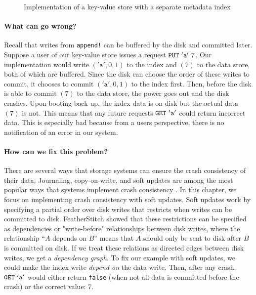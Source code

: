 
\begin{figure}[h]
  \centering
  \vspace{-.5em}
  \caption{Implementation of a key-value store with a separate metadata index}
  \label{fig:kv-single-index}
\end{figure}

\paragraph{What can go wrong?}
Recall that writes from \texttt{append!} can be buffered by the disk and committed later.
Suppose a user of our key-value store issues a request $\texttt{PUT}\ '\texttt{a}' \ 7$.
Our implementation would write $('\texttt{a}', 0, 1)$ to the index and $(7)$ to the data store, both of which are
buffered. Since the disk can choose the order of these writes to commit, it chooses to commit
$('\texttt{a}', 0, 1)$ to the index first. Then, before the disk is able to commit $(7)$ to the data store, the
power goes out and the disk crashes. Upon booting back up, the index data is on disk but the actual data $(7)$ is not.
This means that any future requests $\texttt{GET}\ '\texttt{a}'$ could return incorrect data. This is especially bad
because from a users perspective, there is no notification of an error in our system.

\paragraph{How can we fix this problem?}
There are several ways that storage systems can ensure the crash consistency of their data.
Journaling, copy-on-write, and soft updates are among the most popular ways that systems
implement crash consistency . In this chapter, we focus on implementing crash consistency
with soft updates. Soft updates work by specifying a partial order over disk writes that restricts
when writes can be committed to disk. FeatherStitch  showed that these restrictions can be
specified as dependencies or "write-before" relationships between disk writes, where the relationship
``$A$ depends on $B$'' means that $A$ should only be sent to disk after $B$ is committed on disk.
If we treat these relations as directed edges between disk writes, we get a \textit{dependency graph}.
To fix our example with soft updates, we could make the index write \textit{depend on} the data write.
Then, after any crash, $\texttt{GET}\ '\texttt{a}'$ would either return \texttt{false} (when not all data is committed
before the crash) or the correct value: $7$.

